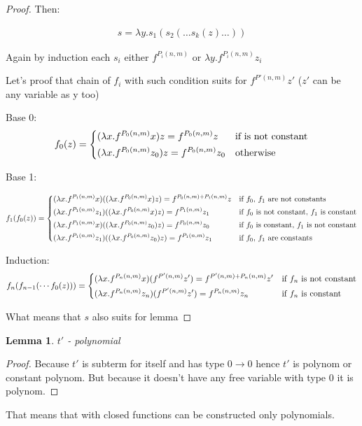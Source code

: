 \documentclass[11pt]{article}
\newtheorem{lemma}[theorem]{Lemma}
\newcommand{\gl}{\lambda}
\newcommand{\too}{\rightarrow}
\begin{document}
\begin{proof}
Then:

\begin{align*}
    s = \gl y. s_1(s_2(\dots s_k(z) \dots))
\end{align*}

Again by induction each \(s_i\) either \(f^{P_i(n, m)}\) or \(\gl y.f^{P_i(n, m)} z_i\)

Let's proof that chain of \(f_i\) with such condition suits for \(f^{P'(n, m)} z'\) (\(z'\) can be any variable as y too)

Base 0: 
\[
    f_0 (z) = 
\begin{dcases}
    (\gl x. f^{P_0(n, m)} x) z = f^{P_0(n, m)} z & \text{if is not constant} \\
    (\gl x. f^{P_0(n, m)} z_0) z = f^{P_0(n, m)} z_0 & \text{otherwise}
\end{dcases}
\]

Base 1:

\[
f_1 (f_0(z)) =
\begin{dcases}
    (\gl x. f^{P_1(n, m)} x) ((\gl x. f^{P_0(n, m)} x) z)  = f^{P_0(n, m) + P_1(n, m)} z & \text{if \(f_0\), \(f_1\) are not constants} \\
    (\gl x. f^{P_1(n, m)} z_1) ((\gl x. f^{P_0(n, m)} x) z) = f^{P_1(n, m)} z_1 & \text{if \(f_0\) is not constant, \(f_1\) is constant} \\
    (\gl x. f^{P_1(n, m)} x) ((\gl x. f^{P_0(n, m)} z_0) z) = f^{P_0(n, m)} z_0 & \text{if \(f_0\) is constant, \(f_1\) is not constant} \\
    (\gl x. f^{P_1(n, m)} z_1) ((\gl x. f^{P_0(n, m)} z_0) z) = f^{P_1(n, m)} z_1 & \text{if \(f_0\), \(f_1\) are constants} \\
\end{dcases}
\]

Induction:
\[
    f_n (f_{n - 1}(\cdots f_0(z))) =
\begin{dcases}
    (\gl x. f^{P_n(n, m)} x) (f^{P'(n, m)} z') = f^{P'(n, m) + P_n(n, m)} z' & \text{if \(f_n\) is not constant} \\
    (\gl x. f^{P_n(n, m)} z_n) (f^{P'(n, m)} z') = f^{P_n(n, m)} z_n & \text{if \(f_n\) is constant} \\
\end{dcases}
\]

What means that \(s\) also suits for lemma

\end{proof}

\begin{lemma}
    \(t'\) - polynomial
\end{lemma}

\begin{proof}
    Because \(t'\) is subterm for itself and has type \(0 \too 0\) hence \(t'\) is polynom or constant polynom.
    But because it doesn't have any free variable with type \(0\) it is polynom.  
\end{proof}

That means that with closed functions can be constructed only polynomials.
\end{document}
